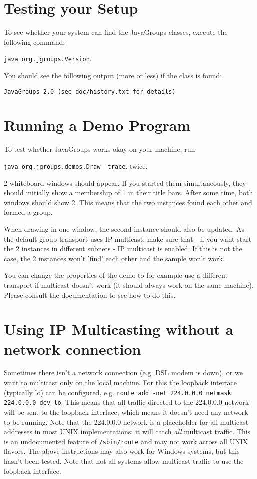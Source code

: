   \section{Testing your Setup}

  To see whether your system can find the JavaGroups classes, execute the following
  command:

  {\tt java org.jgroups.Version}.

  You should see the following output (more or less) if the class is found: 

  {\tt JavaGroups 2.0 (see doc/history.txt for details)}


  \section{Running a Demo Program}

  To test whether JavaGroups works okay on your machine, run

  {\tt java org.jgroups.demos.Draw -trace}. twice.

  2 whiteboard windows should appear. If you started them simultaneously, they should
  initially show a membership of 1 in their title bars. After some time, both windows
  should show 2. This means that the two instances found each other and formed a
  group.

  When drawing in one window, the second instance should also be updated. As the
  default group transport uses IP multicast, make sure that - if you want start the 2
  instances in different subnets - IP multicast is enabled. If this is not the case,
  the 2 instances won't 'find' each other and the sample won't work.

  You can change the properties of the demo to for example use a different transport
  if multicast doesn't work (it should always work on the same machine). Please
  consult the documentation to see how to do this.


  \section{Using IP Multicasting without a network connection}

  Sometimes there isn't a network connection (e.g. DSL modem is down), or we want to
  multicast only on the local machine. For this the loopback interface (typically lo)
  can be configured, e.g.  {\tt route add -net 224.0.0.0 netmask 224.0.0.0 dev
  lo}. This means that all traffic directed to the 224.0.0.0 network will be sent to
  the loopback interface, which means it doesn't need any network to be running. Note
  that the 224.0.0.0 network is a placeholder for all multicast addresses in most
  UNIX implementations: it will catch {\em all} multicast traffic. This is an
  undocumented feature of {\tt /sbin/route} and may not work across all UNIX
  flavors. The above instructions may also work for Windows systems, but this hasn't
  been tested. Note that not all systems allow multicast traffic to use the loopback
  interface.


